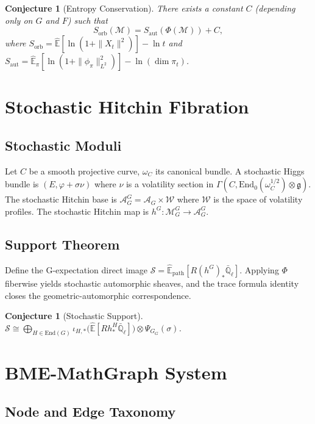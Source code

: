 \documentclass[11pt,a4paper]{article}
\newtheorem{conjecture}[theorem]{Conjecture}
\theoremstyle{definition}
\newcommand{\End}{\mathrm{End}}
\newcommand{\GExp}{\hat{\mathbb{E}}}
\newcommand{\PSI}{\Psi_G}
\begin{document}
\begin{conjecture}[Entropy Conservation]\label{conj:entropy}
There exists a constant $C$ (depending only on $G$ and $F$) such that
\[
S_{\mathrm{orb}}(\mathcal{M}) = S_{\mathrm{aut}}(\Phi(\mathcal{M})) + C,
\]
where $S_{\mathrm{orb}} = \GExp[\ln(1+\|X_t\|^2)] - \ln t$ and $S_{\mathrm{aut}} = \GExp_\pi[\ln(1+\|\phi_\pi\|_{L^2}^2)] - \ln(\dim \pi_t)$.
\end{conjecture}

\section{Stochastic Hitchin Fibration}\label{sec:hitchin}

\subsection{Stochastic Moduli}

Let $C$ be a smooth projective curve, $\omega_C$ its canonical bundle. A stochastic Higgs bundle is $(E, \varphi + \sigma\nu)$ where $\nu$ is a volatility section in $\Gamma(C, \End_0(\omega_C^{1/2})\otimes\mathfrak{g})$. The stochastic Hitchin base is $\mathcal{A}_G^G = \mathcal{A}_G \times \mathcal{W}$ where $\mathcal{W}$ is the space of volatility profiles. The stochastic Hitchin map is $h^G: \mathcal{M}_G^G \to \mathcal{A}_G^G$.

\subsection{Support Theorem}

Define the G-expectation direct image $\mathcal{S} = \GExp_{\mathrm{path}}[R(h^G)_*\bar{\mathbb{Q}}_\ell]$. Applying $\Phi$ fiberwise yields stochastic automorphic sheaves, and the trace formula identity closes the geometric-automorphic correspondence.

\begin{conjecture}[Stochastic Support]\label{conj:support}
$\mathcal{S} \cong \bigoplus_{H\in\mathrm{End}(G)} \iota_{H,*}\big(\GExp[R h^H_*\bar{\mathbb{Q}}_\ell]\big) \otimes \PSI_G(\sigma)$.
\end{conjecture}

\section{BME-MathGraph System}\label{sec:bme}

\subsection{Node and Edge Taxonomy}
\end{document}
